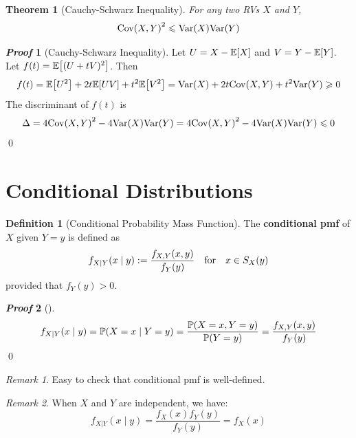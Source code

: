 \documentclass[10pt,UTF8]{article}
\newenvironment{definition box}
{\begin{tcolorbox}[colback=blue!5!white,colframe=blue!75!black,parbox=false,before upper=\par,before lower=\par]}
{\end{tcolorbox}}
\newenvironment{theorem box}
{\begin{tcolorbox}[colback=yellow!5!white,colframe=yellow!75!black,parbox=false,before upper=\par,before lower=\par]}
{\end{tcolorbox}}
\theoremstyle{definition}
\newtheorem{definition inner}{Definition}[section]
\newenvironment{definition}[1][]
{\begin{definition box}\begin{definition inner}[#1]\hfill\par}
{\end{definition inner}\end{definition box}}
\theoremstyle{plain}
\newtheorem{theorem inner}{Theorem}[section]
\newenvironment{theorem}[1][]
{\begin{theorem box}\begin{theorem inner}[#1]\hfill\par}
{\end{theorem inner}\end{theorem box}}
\theoremstyle{definition}
\newtheorem*{proof inner}{\textit{Proof}}
\renewenvironment{proof}[1][]
{\begin{proof inner}[#1]\hfill\par}
{\qed\end{proof inner}}
\theoremstyle{remark}
\newtheorem*{remark}{\textit{Remark}}
\newcommand{\E}[1]{\mathbb{E}\qty[#1]}  %
\newcommand{\Prob}{\mathbb{P}\qty}
\newcommand{\Var}{\mathrm{Var}\qty}  %
\newcommand{\Cov}{\mathrm{Cov}\qty}  %
\begin{document}
\begin{theorem}[Cauchy-Schwarz Inequality]
    For any two RVs $X$ and $Y$,
    \begin{equation*}
        \Cov(X,Y)^2 \leqslant \Var(X)\Var(Y)
    \end{equation*}
\end{theorem}
\begin{proof}[Cauchy-Schwarz Inequality]
    Let $U=X-\E{X}$ and $V=Y-\E{Y}$.
    Let $f(t)=\E{(U+t V)^2}$. Then
    \begin{equation*}
        f(t) = \E{U^2} + 2 t\E{U V} + t^2\E{V^2}
        = \Var(X) + 2 t\Cov(X,Y) + t^2\Var(Y)
        \geqslant 0
    \end{equation*}
    The discriminant of $f(t)$ is
    \begin{equation*}
        \Delta = 4\Cov(X,Y)^2 - 4\Var(X)\Var(Y)
        = 4\Cov(X,Y)^2 - 4\Var(X)\Var(Y) \leqslant 0
    \end{equation*}
\end{proof}

\section{Conditional Distributions}

\begin{definition}[Conditional Probability Mass Function]
    The \textbf{conditional pmf} of $X$ given $Y=y$ is defined as
    \begin{equation*}
        f_{X|Y}(x\mid y) := \frac{f_{X,Y}(x,y)}{f_Y(y)}
        \qfor x\in S_X(y)
    \end{equation*}
    provided that $f_Y(y)>0$.
\end{definition}

\begin{proof}
    \begin{equation*}
        f_{X|Y}(x\mid y) = \Prob(X=x\mid Y=y) = \frac{\Prob(X=x,Y=y)}{\Prob(Y=y)}
        = \frac{f_{X,Y}(x,y)}{f_Y(y)}
    \end{equation*}
\end{proof}

\begin{remark}
    Easy to check that conditional pmf is well-defined.
\end{remark}
\begin{remark}
    When $X$ and $Y$ are independent, we have:
    \begin{equation*}
        f_{X|Y}(x\mid y) = \frac{f_X(x)f_Y(y)}{f_Y(y)} = f_X(x)
    \end{equation*}
\end{remark}
    
\end{document}
